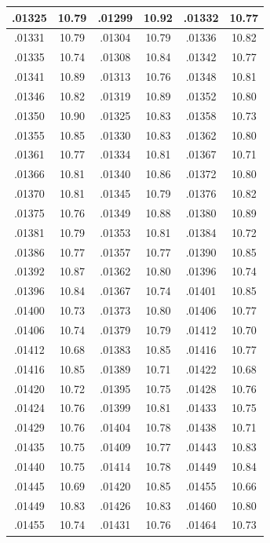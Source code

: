 \documentclass[10pt,twoside]{report}
\begin{document}
\begin{appendices}
\begin{longtable}{|c|c||c|c||c|c|}
.01325 & 10.79 & .01299 & 10.92 & .01332 & 10.77\\\hline
.01331 & 10.79 & .01304 & 10.79 & .01336 & 10.82\\\hline
.01335 & 10.74 & .01308 & 10.84 & .01342 & 10.77\\\hline
.01341 & 10.89 & .01313 & 10.76 & .01348 & 10.81\\\hline
.01346 & 10.82 & .01319 & 10.89 & .01352 & 10.80\\\hline
.01350 & 10.90 & .01325 & 10.83 & .01358 & 10.73\\\hline
.01355 & 10.85 & .01330 & 10.83 & .01362 & 10.80\\\hline
.01361 & 10.77 & .01334 & 10.81 & .01367 & 10.71\\\hline
.01366 & 10.81 & .01340 & 10.86 & .01372 & 10.80\\\hline
.01370 & 10.81 & .01345 & 10.79 & .01376 & 10.82\\\hline
.01375 & 10.76 & .01349 & 10.88 & .01380 & 10.89\\\hline
.01381 & 10.79 & .01353 & 10.81 & .01384 & 10.72\\\hline
.01386 & 10.77 & .01357 & 10.77 & .01390 & 10.85\\\hline
.01392 & 10.87 & .01362 & 10.80 & .01396 & 10.74\\\hline
.01396 & 10.84 & .01367 & 10.74 & .01401 & 10.85\\\hline
.01400 & 10.73 & .01373 & 10.80 & .01406 & 10.77\\\hline
.01406 & 10.74 & .01379 & 10.79 & .01412 & 10.70\\\hline
.01412 & 10.68 & .01383 & 10.85 & .01416 & 10.77\\\hline
.01416 & 10.85 & .01389 & 10.71 & .01422 & 10.68\\\hline
.01420 & 10.72 & .01395 & 10.75 & .01428 & 10.76\\\hline
.01424 & 10.76 & .01399 & 10.81 & .01433 & 10.75\\\hline
.01429 & 10.76 & .01404 & 10.78 & .01438 & 10.71\\\hline
.01435 & 10.75 & .01409 & 10.77 & .01443 & 10.83\\\hline
.01440 & 10.75 & .01414 & 10.78 & .01449 & 10.84\\\hline
.01445 & 10.69 & .01420 & 10.85 & .01455 & 10.66\\\hline
.01449 & 10.83 & .01426 & 10.83 & .01460 & 10.80\\\hline
.01455 & 10.74 & .01431 & 10.76 & .01464 & 10.73\\\hline

\end{longtable}
\end{appendices}
\end{document}
